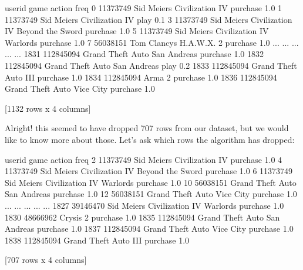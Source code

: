 \documentclass[letterpaper,10pt,english]{jupyterBook}
\begin{document}
\begin{sphinxVerbatim}[commandchars=\\\{\}]
        user\PYGZus{}id                                          game    action  freq
0      11373749                   Sid Meier\PYGZsq{}s Civilization IV  purchase   1.0
1      11373749                   Sid Meier\PYGZsq{}s Civilization IV      play   0.1
3      11373749  Sid Meier\PYGZsq{}s Civilization IV Beyond the Sword  purchase   1.0
5      11373749          Sid Meier\PYGZsq{}s Civilization IV Warlords  purchase   1.0
7      56038151                       Tom Clancy\PYGZsq{}s H.A.W.X. 2  purchase   1.0
...         ...                                           ...       ...   ...
1831  112845094                  Grand Theft Auto San Andreas  purchase   1.0
1832  112845094                  Grand Theft Auto San Andreas      play   0.2
1833  112845094                          Grand Theft Auto III  purchase   1.0
1834  112845094                                        Arma 2  purchase   1.0
1836  112845094                    Grand Theft Auto Vice City  purchase   1.0

[1132 rows x 4 columns]
\end{sphinxVerbatim}

\sphinxAtStartPar
Alright! this seemed to have dropped 707 rows from our dataset, but we would like to know more about those.
Let’s ask which rows the algorithm has dropped:

\begin{sphinxVerbatim}[commandchars=\\\{\}]
\PYG{p}{[}\PYG{p}{]}
\end{sphinxVerbatim}

\begin{sphinxVerbatim}[commandchars=\\\{\}]
        user\PYGZus{}id                                          game    action  freq
2      11373749                   Sid Meier\PYGZsq{}s Civilization IV  purchase   1.0
4      11373749  Sid Meier\PYGZsq{}s Civilization IV Beyond the Sword  purchase   1.0
6      11373749          Sid Meier\PYGZsq{}s Civilization IV Warlords  purchase   1.0
10     56038151                  Grand Theft Auto San Andreas  purchase   1.0
12     56038151                    Grand Theft Auto Vice City  purchase   1.0
...         ...                                           ...       ...   ...
1827   39146470          Sid Meier\PYGZsq{}s Civilization IV Warlords  purchase   1.0
1830   48666962                                      Crysis 2  purchase   1.0
1835  112845094                  Grand Theft Auto San Andreas  purchase   1.0
1837  112845094                    Grand Theft Auto Vice City  purchase   1.0
1838  112845094                          Grand Theft Auto III  purchase   1.0

[707 rows x 4 columns]
\end{sphinxVerbatim}
\end{document}
